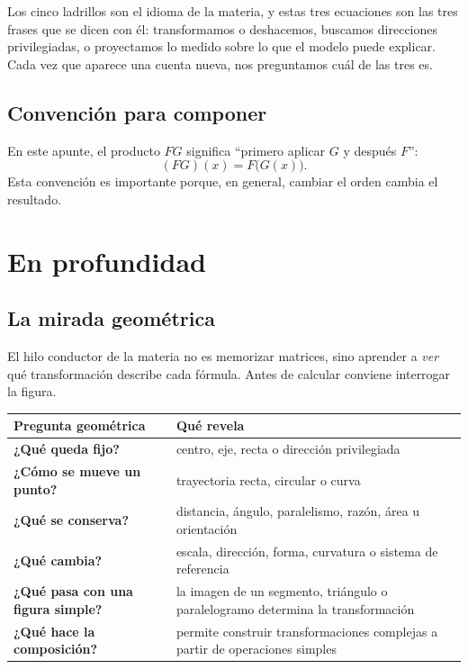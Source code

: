 \begin{resultado}[Las tres ecuaciones maestras de la materia (\(Ax=b\), \(Ax=\lambda x\), \(Ax\approx b\))]
\smallskip
Los cinco ladrillos son el idioma de la materia, y estas tres ecuaciones son las tres frases que se dicen con él: transformamos o deshacemos, buscamos direcciones privilegiadas, o proyectamos lo medido sobre lo que el modelo puede explicar. Cada vez que aparece una cuenta nueva, nos preguntamos cuál de las tres es.
\end{resultado}

\subsection{Convención para componer}

En este apunte, el producto \(F G\) significa ``primero aplicar \(G\) y después \(F\)'':
\[
  (F G)(x)=F\bigl(G(x)\bigr).
\]
Esta convención es importante porque, en general, cambiar el orden cambia el resultado.

\section{En profundidad}

\subsection{La mirada geométrica}

El hilo conductor de la materia no es memorizar matrices, sino aprender a \emph{ver} qué
transformación describe cada fórmula. Antes de calcular conviene interrogar la figura.

\begin{center}
\begin{tabularx}{\textwidth}{>{\bfseries}p{38mm} X}
\toprule
Pregunta geométrica & Qué revela\\
\midrule
¿Qué queda fijo? & centro, eje, recta o dirección privilegiada\\
¿Cómo se mueve un punto? & trayectoria recta, circular o curva\\
¿Qué se conserva? & distancia, ángulo, paralelismo, razón, área u orientación\\
¿Qué cambia? & escala, dirección, forma, curvatura o sistema de referencia\\
¿Qué pasa con una figura simple? & la imagen de un segmento, triángulo o paralelogramo
determina la transformación\\
¿Qué hace la composición? & permite construir transformaciones complejas a partir de
operaciones simples\\
\bottomrule
\end{tabularx}
\end{center}

